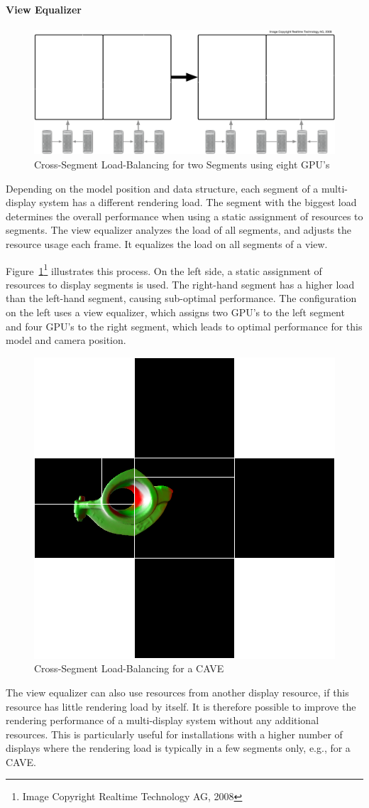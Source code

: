 \documentclass[10pt,a4]{scrartcl}
\newcommand{\fig}[1]{Figure~\ref{#1}}
\begin{document}
\paragraph{View Equalizer}

\begin{figure}
  \includegraphics[width=.618\textwidth]{images/viewLB.pdf}
  {\caption{\label{fViewLoadBalancing}\small Cross-Segment
      Load-Balancing for two Segments using eight GPU's}}
\end{figure}
Depending on the model position and data structure, each segment of a
multi-display system has a different rendering load. The segment with
the biggest load determines the overall performance when using a static
assignment of resources to segments. The view equalizer analyzes the
load of all segments, and adjusts the resource usage each frame. It
equalizes the load on all segments of a view.

\fig{fViewLoadBalancing}\footnote{Image Copyright Realtime Technology
  AG, 2008} illustrates this process. On the left side, a static
assignment of resources to display segments is used. The right-hand
segment has a higher load than the left-hand segment, causing
sub-optimal performance. The configuration on the left uses a view
equalizer, which assigns two GPU's to the left segment and four GPU's to
the right segment, which leads to optimal performance for this model and
camera position.

\begin{figure} 
    \includegraphics[width=.382\textwidth]{images/viewLB.png}
    {\caption{\label{fViewLoadBalancing2}\small Cross-Segment
        Load-Balancing for a CAVE}}
\end{figure}
The view equalizer can also use resources from another display resource,
if this resource has little rendering load by itself. It is therefore
possible to improve the rendering performance of a multi-display system
without any additional resources. This is particularly useful for
installations with a higher number of displays where the rendering load
is typically in a few segments only, e.g., for a CAVE.
\end{document}

